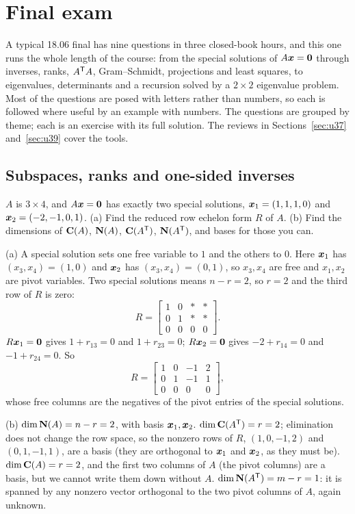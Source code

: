\section{Final exam}\label{sec:u40}

A typical 18.06 final has nine questions in three closed-book hours, and this one runs the whole length of the course: from the special solutions of $A\boldsymbol{x}=\boldsymbol{0}$ through inverses, ranks, $A^{\mathsf{T}} A$, Gram--Schmidt, projections and least squares, to eigenvalues, determinants and a recursion solved by a $2\times2$ eigenvalue problem. Most of the questions are posed with letters rather than numbers, so each is followed where useful by an example with numbers. The questions are grouped by theme; each is an exercise with its full solution. The reviews in Sections~\ref{sec:u37} and~\ref{sec:u39} cover the tools.

\subsection{Subspaces, ranks and one-sided inverses}

\begin{exercise}[Question 1]\label{exr:u40-q1}
$A$ is $3\times4$, and $A\boldsymbol{x}=\boldsymbol{0}$ has exactly two special solutions,
$\boldsymbol{x}_1=(1,1,1,0)$ and $\boldsymbol{x}_2=(-2,-1,0,1)$.
(a) Find the reduced row echelon form $R$ of $A$.
(b) Find the dimensions of $\mathbf{C}(A)$, $\mathbf{N}(A)$, $\mathbf{C}(A^{\mathsf{T}})$, $\mathbf{N}(A^{\mathsf{T}})$, and bases for those you can.
\end{exercise}
\begin{solution}
(a) A special solution sets one free variable to $1$ and the others to $0$. Here $\boldsymbol{x}_1$ has $(x_3,x_4)=(1,0)$ and $\boldsymbol{x}_2$ has $(x_3,x_4)=(0,1)$, so $x_3,x_4$ are free and $x_1,x_2$ are pivot variables. Two special solutions means $n-r=2$, so $r=2$ and the third row of $R$ is zero:
\[
R=\begin{bmatrix}1&0&*&*\\0&1&*&*\\0&0&0&0\end{bmatrix}.
\]
$R\boldsymbol{x}_1=\boldsymbol{0}$ gives $1+r_{13}=0$ and $1+r_{23}=0$; $R\boldsymbol{x}_2=\boldsymbol{0}$ gives $-2+r_{14}=0$ and $-1+r_{24}=0$. So
\[
R=\begin{bmatrix}1&0&-1&2\\0&1&-1&1\\0&0&0&0\end{bmatrix},
\]
whose free columns are the negatives of the pivot entries of the special solutions.

(b) $\dim\mathbf{N}(A)=n-r=2$, with basis $\boldsymbol{x}_1,\boldsymbol{x}_2$. $\dim\mathbf{C}(A^{\mathsf{T}})=r=2$; elimination does not change the row space, so the nonzero rows of $R$, $(1,0,-1,2)$ and $(0,1,-1,1)$, are a basis (they are orthogonal to $\boldsymbol{x}_1$ and $\boldsymbol{x}_2$, as they must be). $\dim\mathbf{C}(A)=r=2$, and the first two columns of $A$ (the pivot columns) are a basis, but we cannot write them down without $A$. $\dim\mathbf{N}(A^{\mathsf{T}})=m-r=1$: it is spanned by any nonzero vector orthogonal to the two pivot columns of $A$, again unknown.
\end{solution}

